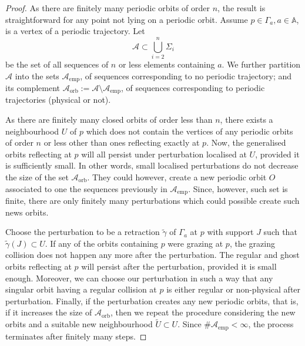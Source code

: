 \documentclass[reqno,11pt]{amsart}
\begin{document}
 \begin{proof}
    As there are finitely many periodic orbits of order \( n \), the result is straightforward for any point not lying on a periodic orbit.
    Assume \( p \in \Gamma_a, a \in \mathbb{A} \), is a vertex of a periodic trajectory.
    Let 
    \[
        \mathcal{A} \subset \bigcup_{i=2}^n\Sigma_i
    \]
    be the set of all sequences of \( n \) or less elements containing \( a \).
    We further partition \( \mathcal{A} \) into the sets \( \mathcal{A}_{\mathrm{emp}} \), of sequences corresponding to no periodic trajectory; and its complement \( \mathcal{A}_\mathrm{orb}:= \mathcal{A}\setminus \mathcal{A}_{\mathrm{emp}} \), of sequences corresponding to periodic trajectories (physical or not).
    \par As there are finitely many closed orbits of order less than \( n \), there exists a neighbourhood \( U \) of \( p \) which does not contain the vertices of any periodic orbits of order \( n \) or less other than ones reflecting exactly at \( p \).
    Now, the generalised orbits reflecting at \( p \) will all persist under perturbation localised at \( U \), provided it is sufficiently small.    
    In other words, small localised perturbations do not decrease the size of the set \( \mathcal{A}_\mathrm{orb} \).
    They could however, create a new periodic orbit \( O \) associated to one the sequences previously in \( \mathcal{A}_\mathrm{emp} \).
    Since, however, such set is finite, there are only finitely many perturbations which could possible create such news orbits.
    \par Choose the perturbation to be a retraction \( \widetilde\gamma \) of \( \Gamma_a \) at \( p \) with support \( J \) such that \( \widetilde\gamma(J) \subset U \). 
    If any of the orbits containing \( p \) were grazing at \( p \), the grazing collision does not happen any more after the perturbation.
    The regular and ghost orbits reflecting at \( p \) will persist after the perturbation, provided it is small enough.
    Moreover, we can choose our perturbation in such a way that any singular orbit having a regular collision at \( p \) is either regular or non-physical after perturbation.
    Finally, if the perturbation creates any new periodic orbits, that is, if it increases the size of \( \mathcal{A}_\mathrm{orb} \), then we repeat the procedure considering the new orbits and a suitable new neighbourhood \( \widetilde U \subset U \).
    Since \( \#\mathcal{A}_\mathrm{emp} < \infty \), the process terminates after finitely many steps.
\end{proof}
\end{document}
